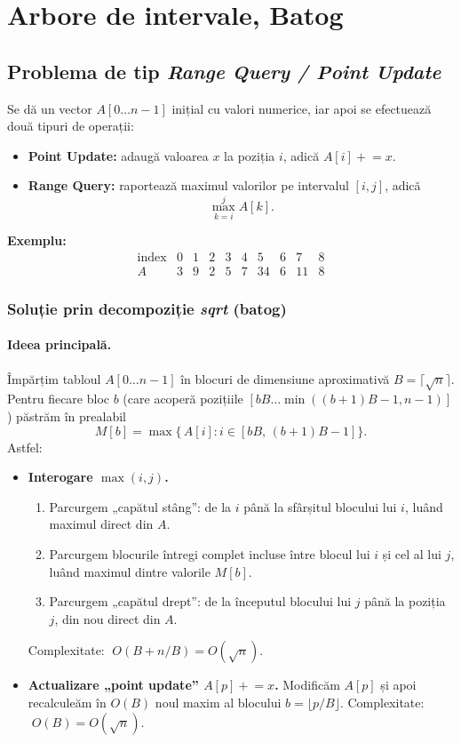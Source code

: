 \documentclass[11pt,a4paper]{article}
\theoremstyle{definition}
\theoremstyle{plain}
\theoremstyle{remark}
\begin{document}
\section{Arbore de intervale, Batog}
\subsection*{Problema de tip \emph{Range Query / Point Update}}

Se dă un vector \(A[0\ldots n-1]\) inițial cu valori numerice, iar apoi se efectuează două tipuri de operații:
\begin{itemize}
  \item \textbf{Point Update:} adaugă valoarea \(x\) la poziția \(i\), adică \(A[i]\mathrel{+}=x\).
  \item \textbf{Range Query:} raportează maximul valorilor pe intervalul \([i, j]\), adică
    \[
      \max_{k=i}^{j} A[k].
    \]
\end{itemize}

\noindent\textbf{Exemplu:}
\[
\begin{array}{c|ccccccccc}
\text{index} & 0 & 1 & 2 & 3 & 4 & 5 & 6 & 7 & 8 \\\hline
A           & 3 & 9 & 2 & 5 & 7 & 34 & 6 & 11 & 8
\end{array}
\]

\subsubsection*{Soluție prin decompoziție \emph{sqrt} (batog)}

\paragraph{Ideea principală.}
Împărțim tabloul \(A[0\ldots n-1]\) în blocuri de dimensiune aproximativă \(B=\lceil\sqrt n\rceil\). Pentru fiecare bloc \(b\) (care acoperă pozițiile \([bB\ldots \min((b+1)B-1,n-1)]\)) păstrăm în prealabil
\[
  M[b] = \max\{\,A[i]\colon i\in[bB,\,(b+1)B-1]\}.
\]
Astfel:
\begin{itemize}
  \item \textbf{Interogare \(\max(i,j)\).}
    \begin{enumerate}
      \item Parcurgem „capătul stâng”: de la \(i\) până la sfârșitul blocului lui \(i\), luând maximul direct din \(A\).
      \item Parcurgem blocurile întregi complet incluse între blocul lui \(i\) și cel al lui \(j\), luând maximul dintre valorile \(M[b]\).
      \item Parcurgem „capătul drept”: de la începutul blocului lui \(j\) până la poziția \(j\), din nou direct din \(A\).
    \end{enumerate}
    Complexitate: \(\;O(B + n/B) = O(\sqrt n)\).
  \item \textbf{Actualizare „point update” \(A[p]\mathrel{+}=x\).}
    Modificăm \(A[p]\) și apoi recalculeăm în \(O(B)\) noul maxim al blocului \(b=\lfloor p/B\rfloor\).
    Complexitate: \(\;O(B)=O(\sqrt n)\).
\end{itemize}
\end{document}
